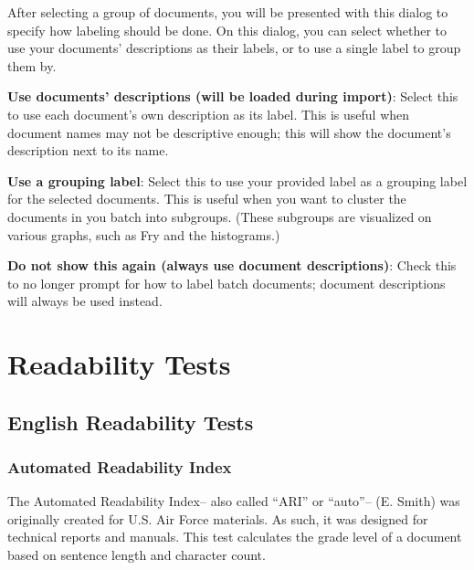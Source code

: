 \documentclass[
]{book}
\newenvironment{optionssection}
    {
    \begin{tcolorbox}[colframe=lightgray,colback=ultralightgray,sharp corners=all,parbox=false]
    }
    {
    \end{tcolorbox}
    }
\theoremstyle{definition}
\theoremstyle{definition}
\theoremstyle{definition}
\theoremstyle{definition}
\theoremstyle{remark}
\begin{document}
After selecting a group of documents, you will be presented with this dialog to specify how labeling should be done. On this dialog, you can select whether to use your documents' descriptions as their labels, or to use a single label to group them by.

\begin{optionssection}
\textbf{Use documents' descriptions (will be loaded during import)}: Select this to use each document's own description as its label. This is useful when document names may not be descriptive enough; this will show the document's description next to its name.

\textbf{Use a grouping label}: Select this to use your provided label as a grouping label for the selected documents. This is useful when you want to cluster the documents in you batch into subgroups. (These subgroups are visualized on various graphs, such as Fry and the histograms.)

\end{optionssection}

\textbf{Do not show this again (always use document descriptions)}: Check this to no longer prompt for how to label batch documents; document descriptions will always be used instead.

\hypertarget{part-readability-tests}{%
\part{Readability Tests}\label{part-readability-tests}}

\hypertarget{english-readability-tests}{%
\chapter{English Readability Tests}\label{english-readability-tests}}

\hypertarget{ari-test}{%
\section{\texorpdfstring{Automated Readability Index}{Automated Readability Index}}\label{ari-test}}

The Automated Readability Index-- also called ``ARI'' or ``auto''-- (E. Smith) was originally created for U.S. Air Force materials. As such, it was designed for technical reports and manuals. This test calculates the grade level of a document based on sentence length and character count.
\end{document}
